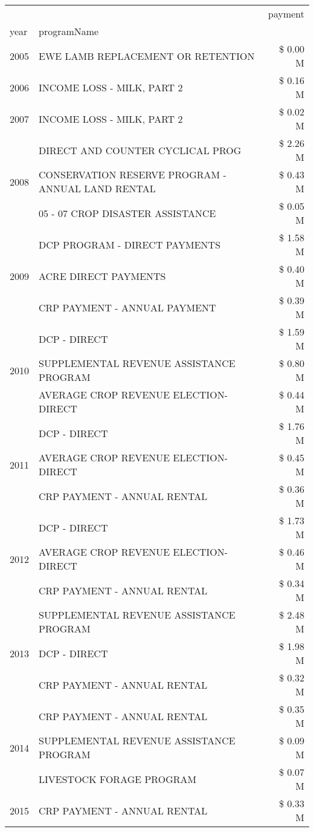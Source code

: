 \begin{tabular}{llr}
\toprule
 &  & payment \\
year & programName &  \\
\midrule
2005 & EWE LAMB REPLACEMENT OR RETENTION & \$ 0.00 M \\
\cline{1-3}
2006 & INCOME LOSS - MILK, PART 2 & \$ 0.16 M \\
\cline{1-3}
2007 & INCOME LOSS - MILK, PART 2 & \$ 0.02 M \\
\cline{1-3}
\multirow[t]{3}{*}{2008} & DIRECT AND COUNTER CYCLICAL PROG & \$ 2.26 M \\
 & CONSERVATION RESERVE PROGRAM - ANNUAL LAND RENTAL & \$ 0.43 M \\
 & 05 - 07 CROP DISASTER ASSISTANCE & \$ 0.05 M \\
\cline{1-3}
\multirow[t]{3}{*}{2009} & DCP PROGRAM - DIRECT PAYMENTS & \$ 1.58 M \\
 & ACRE DIRECT PAYMENTS & \$ 0.40 M \\
 & CRP PAYMENT - ANNUAL PAYMENT & \$ 0.39 M \\
\cline{1-3}
\multirow[t]{3}{*}{2010} & DCP - DIRECT & \$ 1.59 M \\
 & SUPPLEMENTAL REVENUE ASSISTANCE PROGRAM & \$ 0.80 M \\
 & AVERAGE CROP REVENUE ELECTION-DIRECT & \$ 0.44 M \\
\cline{1-3}
\multirow[t]{3}{*}{2011} & DCP - DIRECT & \$ 1.76 M \\
 & AVERAGE CROP REVENUE ELECTION-DIRECT & \$ 0.45 M \\
 & CRP PAYMENT - ANNUAL RENTAL & \$ 0.36 M \\
\cline{1-3}
\multirow[t]{3}{*}{2012} & DCP - DIRECT & \$ 1.73 M \\
 & AVERAGE CROP REVENUE ELECTION-DIRECT & \$ 0.46 M \\
 & CRP PAYMENT - ANNUAL RENTAL & \$ 0.34 M \\
\cline{1-3}
\multirow[t]{3}{*}{2013} & SUPPLEMENTAL REVENUE ASSISTANCE PROGRAM & \$ 2.48 M \\
 & DCP - DIRECT & \$ 1.98 M \\
 & CRP PAYMENT - ANNUAL RENTAL & \$ 0.32 M \\
\cline{1-3}
\multirow[t]{3}{*}{2014} & CRP PAYMENT - ANNUAL RENTAL & \$ 0.35 M \\
 & SUPPLEMENTAL REVENUE ASSISTANCE PROGRAM & \$ 0.09 M \\
 & LIVESTOCK FORAGE PROGRAM & \$ 0.07 M \\
\cline{1-3}
\multirow[t]{3}{*}{2015} & CRP PAYMENT - ANNUAL RENTAL & \$ 0.33 M \\

\end{tabular}
